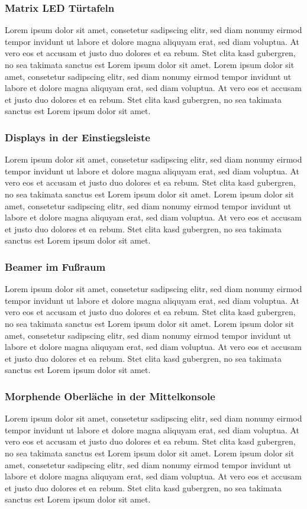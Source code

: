 \subsubsection{Matrix LED Türtafeln}
Lorem ipsum dolor sit amet, consetetur sadipscing elitr, sed diam nonumy eirmod tempor invidunt ut labore et dolore magna aliquyam erat, sed diam voluptua. At vero eos et accusam et justo duo dolores et ea rebum. Stet clita kasd gubergren, no sea takimata sanctus est Lorem ipsum dolor sit amet. Lorem ipsum dolor sit amet, consetetur sadipscing elitr, sed diam nonumy eirmod tempor invidunt ut labore et dolore magna aliquyam erat, sed diam voluptua. At vero eos et accusam et justo duo dolores et ea rebum. Stet clita kasd gubergren, no sea takimata sanctus est Lorem ipsum dolor sit amet.
\subsubsection{Displays in der Einstiegsleiste}
Lorem ipsum dolor sit amet, consetetur sadipscing elitr, sed diam nonumy eirmod tempor invidunt ut labore et dolore magna aliquyam erat, sed diam voluptua. At vero eos et accusam et justo duo dolores et ea rebum. Stet clita kasd gubergren, no sea takimata sanctus est Lorem ipsum dolor sit amet. Lorem ipsum dolor sit amet, consetetur sadipscing elitr, sed diam nonumy eirmod tempor invidunt ut labore et dolore magna aliquyam erat, sed diam voluptua. At vero eos et accusam et justo duo dolores et ea rebum. Stet clita kasd gubergren, no sea takimata sanctus est Lorem ipsum dolor sit amet.
\subsubsection{Beamer im Fußraum}
Lorem ipsum dolor sit amet, consetetur sadipscing elitr, sed diam nonumy eirmod tempor invidunt ut labore et dolore magna aliquyam erat, sed diam voluptua. At vero eos et accusam et justo duo dolores et ea rebum. Stet clita kasd gubergren, no sea takimata sanctus est Lorem ipsum dolor sit amet. Lorem ipsum dolor sit amet, consetetur sadipscing elitr, sed diam nonumy eirmod tempor invidunt ut labore et dolore magna aliquyam erat, sed diam voluptua. At vero eos et accusam et justo duo dolores et ea rebum. Stet clita kasd gubergren, no sea takimata sanctus est Lorem ipsum dolor sit amet.
\subsubsection{Morphende Oberläche in der Mittelkonsole}
Lorem ipsum dolor sit amet, consetetur sadipscing elitr, sed diam nonumy eirmod tempor invidunt ut labore et dolore magna aliquyam erat, sed diam voluptua. At vero eos et accusam et justo duo dolores et ea rebum. Stet clita kasd gubergren, no sea takimata sanctus est Lorem ipsum dolor sit amet. Lorem ipsum dolor sit amet, consetetur sadipscing elitr, sed diam nonumy eirmod tempor invidunt ut labore et dolore magna aliquyam erat, sed diam voluptua. At vero eos et accusam et justo duo dolores et ea rebum. Stet clita kasd gubergren, no sea takimata sanctus est Lorem ipsum dolor sit amet.
